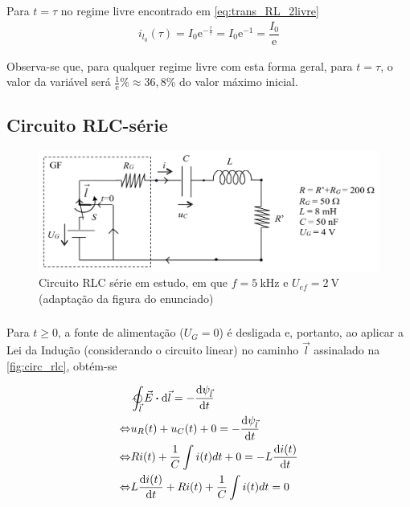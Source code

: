 \documentclass[a4paper, titlepage, portuguese]{article}
\newcommand{\eq}{\Leftrightarrow} %
\newcommand\e{\mathrm{e} }
\begin{document}
	\subsubsection{}
	\par
	Para $t = \tau$ no regime livre encontrado em \eqref{eq:trans_RL_2livre}
	\begin{align*}
		i_{l_0}(\tau) = I_0\e^{-\frac{\tau}{\tau}} = I_0 \e^{-1} = \dfrac{I_0}{\e}
	\end{align*}
	\par
	Observa-se que, para qualquer regime livre com esta forma geral, para $t = \tau$, o valor da variável será $\frac{1}{\e}\% \approx 36,8\%$ do valor máximo inicial.

	\subsection{Circuito RLC-série}
		\begin{figure}[H]
			\centering
			\includegraphics[width=0.7\linewidth]{rlc.png}
			\caption{Circuito RLC série em estudo, em que $f = \SI{5}{\kilo\hertz}$ e $U_{ef} = \SI{2}{\volt}$ (adaptação da figura do enunciado)}
			\label{fig:circ_rlc}
		\end{figure}
	\subsubsection{}

		\par
		Para $t \geq 0$, a fonte de alimentação ($U_G = 0$) é desligada e, portanto, ao aplicar a Lei da Indução (considerando o circuito linear) no caminho $\vec{l}$ assinalado na \autoref{fig:circ_rlc}, obtém-se

		\begin{align*}
			&\ointclockwise_{\vec{l}} \vec{E} \vdot \dd{\vec{l}} = - \dv{\psi_{\vec{l}}}{t} \\ \eq
			&u_R(t) + u_C(t) + 0 = - \dv{\psi_{\vec{l}}}{t} \\ \eq
			&Ri(t) + \frac{1}{C} \int i(t) dt + 0 = -L \dv{i(t)}{t} \\ \eq
			&L \dv{i(t)}{t} + Ri(t) + \frac{1}{C} \int i(t) dt = 0 \\
		\end{align*}
\end{document}
